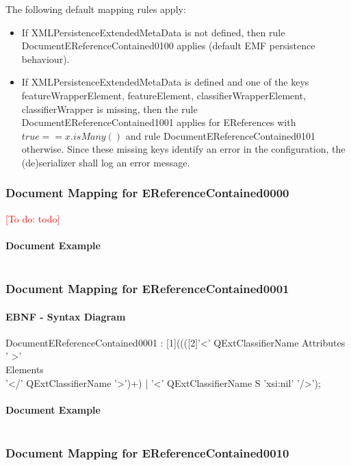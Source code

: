 \documentclass[11pt,a4paper]{article}
\newcommand{\addtodo}[1]{\textcolor{red}{[To do: #1]}\index{TODO: #1}}
\begin{document}
The following default mapping rules apply:
\begin{itemize}
\item If XMLPersistenceExtendedMetaData is not defined, then rule DocumentEReferenceContained0100 applies (default EMF persistence behaviour).
\item If XMLPersistenceExtendedMetaData is defined and one of the keys featureWrapperElement, featureElement, classifierWrapperElement, classifierWrapper is missing, then the rule DocumentEReferenceContained1001 applies for EReferences with $true==x.isMany()$ and rule DocumentEReferenceContained0101 otherwise. Since these missing keys identify an error in the configuration, the (de)serializer shall log an error message.
\end{itemize}

\subsubsection{Document Mapping for EReferenceContained0000}
\addtodo{todo}
\paragraph{Document Example}
\inputminted[fontsize=\footnotesize]{xml}{examples/EReferenceContained0000.xml}

\subsubsection{Document Mapping for EReferenceContained0001}
\paragraph{EBNF - Syntax Diagram}
\begin{rail}
DocumentEReferenceContained0001 : [1]((([2]'<' QExtClassifierName    Attributes ' >' \\
Elements \\
'</' QExtClassifierName   '>')+) 
| '<' QExtClassifierName  S 'xsi:nil' '/>'); 
\end{rail}
\paragraph{Document Example}
\inputminted[fontsize=\footnotesize]{xml}{examples/EReferenceContained0001.xml}


\subsubsection{Document Mapping for EReferenceContained0010}
\end{document}
